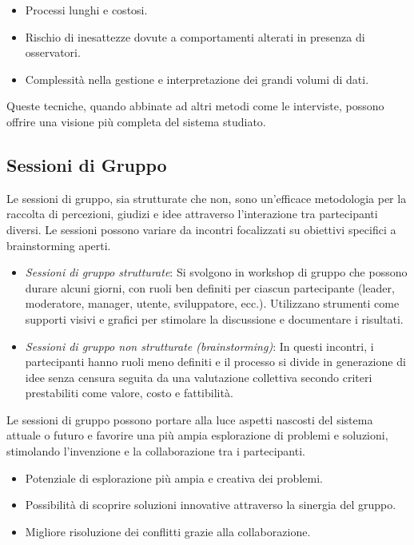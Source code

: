 \begin{tcolorbox}[colback=red!5!white,colframe=red!75!black, title=Svantaggi
    dell'osservazione e degli studi etnografici]
    \begin{itemize}
        \item Processi lunghi e costosi.
        \item Rischio di inesattezze dovute a comportamenti alterati in presenza di
        osservatori.
        \item Complessità nella gestione e interpretazione dei grandi volumi di dati.
    \end{itemize}
\end{tcolorbox}

Queste tecniche, quando abbinate ad altri metodi come le interviste, possono offrire
una visione più completa del sistema studiato.
\subsection{Sessioni di Gruppo}

Le sessioni di gruppo, sia strutturate che non, sono un'efficace metodologia per la
raccolta di percezioni, giudizi e idee attraverso l'interazione tra partecipanti diversi.
Le sessioni possono variare da incontri focalizzati su obiettivi specifici a brainstorming
aperti.

\begin{itemize}
    \item \textit{Sessioni di gruppo strutturate}: Si svolgono in workshop di gruppo che
    possono durare alcuni giorni, con ruoli ben definiti per ciascun partecipante (leader,
    moderatore, manager, utente, sviluppatore, ecc.). Utilizzano strumenti come supporti
    visivi e grafici per stimolare la discussione e documentare i risultati.
    \item \textit{Sessioni di gruppo non strutturate (brainstorming)}: In questi incontri,
    i partecipanti hanno ruoli meno definiti e il processo si divide in generazione di idee
    senza censura seguita da una valutazione collettiva secondo criteri prestabiliti come
    valore, costo e fattibilità.
\end{itemize}

Le sessioni di gruppo possono portare alla luce aspetti nascosti del sistema attuale o
futuro e favorire una più ampia esplorazione di problemi e soluzioni, stimolando
l'invenzione e la collaborazione tra i partecipanti.

\begin{tcolorbox}[colback=green!5!white,colframe=green!75!black, title=Vantaggi delle
    sessioni di gruppo]
    \begin{itemize}
        \item Potenziale di esplorazione più ampia e creativa dei problemi.
        \item Possibilità di scoprire soluzioni innovative attraverso la sinergia del gruppo.
        \item Migliore risoluzione dei conflitti grazie alla collaborazione.
    \end{itemize}
\end{tcolorbox}

